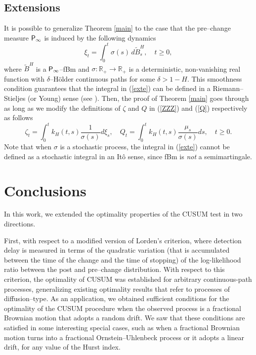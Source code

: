 \documentclass[11pt,reqno]{amsart}
\theoremstyle{remark}
\begin{document}
\subsection{Extensions}
It is possible to generalize Theorem \ref{main} to the case that the  pre--change measure ${{\sf P}}_{\infty}$ is induced by the following dynamics 
\begin{equation} \label{exte}
\xi_{t}= \int_{0}^{t} \sigma(s) \, d\tilde{B}^{H}_{s}, \quad t \geq 0,
\end{equation}
where $\tilde{B}^{H}$ is a ${{\sf P}}_{\infty}$--fBm and $\sigma: \mathbb{R}_{+} \rightarrow \mathbb{R}_{+}$ is a deterministic, non-vanishing real function  with  $\delta$--H\"older continuous paths for some  $\delta >1-H$. This smoothness condition guarantees that the integral in (\ref{exte}) can be defined in a
Riemann--Stieljes (or Young) sense (see \cite{young}). Then, the proof of Theorem \ref{main} goes through as long as we
modify the definitions of $\zeta$ and $Q$ in (\ref{ZZZ}) and (\ref{Q}) respectively as follows 
\begin{equation*} 
\zeta_{t}= \int_{0}^{t} k_{H}(t,s) \frac{1}{\sigma(s)} d\xi_{s}, \quad Q_{t}=\int_{0}^{t} k_{H}(t,s) \frac{\mu_{s}}{\sigma(s)} ds, \quad t \geq 0.
\end{equation*}
Note that when $\sigma$ is a stochastic process, the integral in (\ref{exte}) cannot be defined as a stochastic integral in an It\^{o} sense, 
since fBm is \textit{not} a semimartingale. 

  

\section{Conclusions}
In this work, we extended the optimality properties of the  CUSUM test in two directions. 

First, with respect to a modified version of Lorden's criterion, where detection delay is measured in terms of the quadratic variation (that is accumulated between the time of the change and the time of stopping) of the log-likelihood ratio between the post and pre--change distribution. With respect to this criterion, the optimality of CUSUM was established for
arbitrary continuous-path processes, generalizing existing optimality results that refer to processes of diffusion--type. As an application, we
obtained sufficient conditions for the optimality of the CUSUM procedure when the observed process is a fractional Brownian motion 
that adopts a random drift. We saw that these conditions are satisfied in some interesting special cases, such as when a fractional Brownian motion 
turns into a fractional Ornstein--Uhlenbeck process or it adopts a linear drift, for any value of the Hurst  index.
\end{document}
